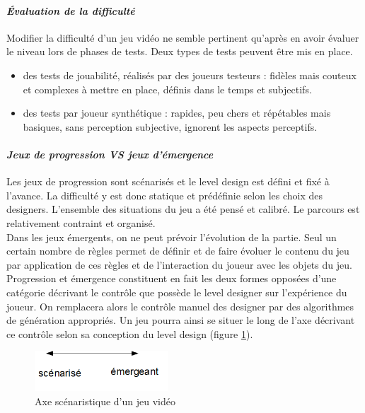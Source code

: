 		\paragraph{\emph{Évaluation de la difficulté}\\ \quad}
Modifier la difficulté d'un jeu vidéo ne semble pertinent qu'après en avoir évaluer le niveau lors de phases de tests. Deux types de tests peuvent être mis en place. 
\begin{itemize}
	\item des tests de jouabilité, réalisés par des joueurs testeurs : fidèles mais couteux et complexes à mettre en place, définis dans le temps et subjectifs.
	\item des tests par joueur synthétique : rapides, peu chers et répétables mais basiques, sans perception subjective, ignorent les aspects perceptifs.
\end {itemize}

	\paragraph{\emph{Jeux de progression VS jeux d’émergence} \\ \quad}
Les jeux de progression sont scénarisés et le level design est défini et fixé à l’avance. La difficulté y est donc statique et prédéfinie selon les choix des designers. L’ensemble des situations du jeu a été pensé et calibré. Le parcours est relativement contraint et organisé. \\
Dans les jeux émergents, on ne peut prévoir l’évolution de la partie. Seul un certain nombre de règles permet de définir et de faire évoluer le contenu du jeu par application de ces règles et de l’interaction du joueur avec les objets du jeu. \\
Progression et émergence constituent en fait les deux formes opposées d’une catégorie décrivant le contrôle que possède le level designer sur l’expérience du joueur. On remplacera alors le contrôle manuel des designer par des algorithmes de génération appropriés. Un jeu pourra ainsi se situer le long de l’axe décrivant ce contrôle selon sa conception du level design (figure \ref{axe_scenaristique}). 
\begin{figure}[hbtp]
\centering
\includegraphics[width=5cm]{images/axe_scenaristique.png}
\caption{Axe scénaristique d'un jeu vidéo}
\label{axe_scenaristique}
\end{figure}

